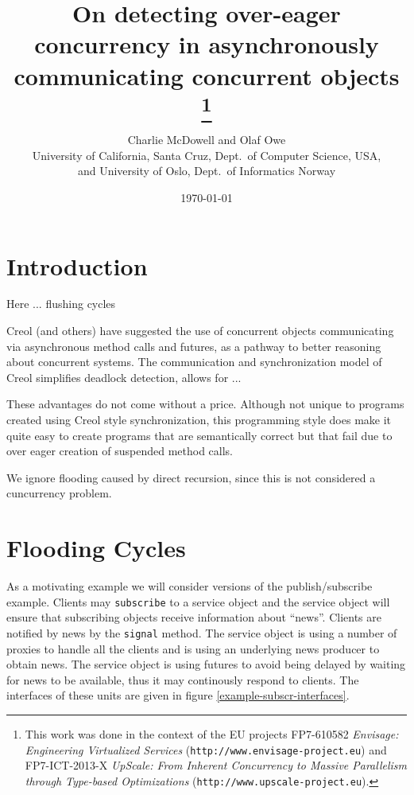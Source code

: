 \documentclass[12pt]{article}%
\begin{document}
\title{On detecting over-eager concurrency  in  asynchronously communicating  concurrent objects%
\thanks{This work was done in the context of the EU projects
   FP7-610582  \emph{Envisage: Engineering Virtualized Services}
    (\texttt{http://www.envisage-project.eu}) and
FP7-ICT-2013-X \emph{UpScale: From Inherent Concurrency to Massive 
Parallelism through Type-based Optimizations}
  (\texttt{http://www.upscale-project.eu}).}}

\author{Charlie McDowell and Olaf Owe\\
 \small{University of California, Santa Cruz, Dept.\ of Computer Science, USA, }\\
 \small{and University of Oslo, Dept.\  of Informatics Norway} 
 }
\date{\today}
\maketitle

\lstset{language=ABS}
\lstset{basicstyle=\ttfamily}


\section{Introduction}
Here ... flushing cycles

Creol (and others) have suggested the use of concurrent objects
communicating via asynchronous method calls and futures, as a pathway
to better reasoning about concurrent systems. The communication and
synchronization model of Creol simplifies deadlock detection, allows
for ...

These advantages do not come without a price.  Although not unique to
programs created using Creol style synchronization, this programming
style does make it quite easy to create programs that are semantically
correct but that fail due to over eager creation of suspended method
calls.


We ignore flooding caused by direct recursion,
since this is not considered a cuncurrency problem.
\section{Flooding Cycles}

As a motivating example we will
consider  versions of the publish/subscribe example.
Clients may  \lstinline{subscribe} to a service object
and the service object will ensure 
that subscribing objects receive information about ``news''.
Clients are notified by news by 
 the   \lstinline{signal} method.
The service object is using a number of proxies to 
handle all the clients and is using  an underlying news producer
to obtain news. The service object is using futures to avoid
being delayed by waiting for news to be available,
thus it may continously respond to clients.
The  interfaces of these units are given 
in figure \ref{example-subscr-interfaces}.
\end{document}
